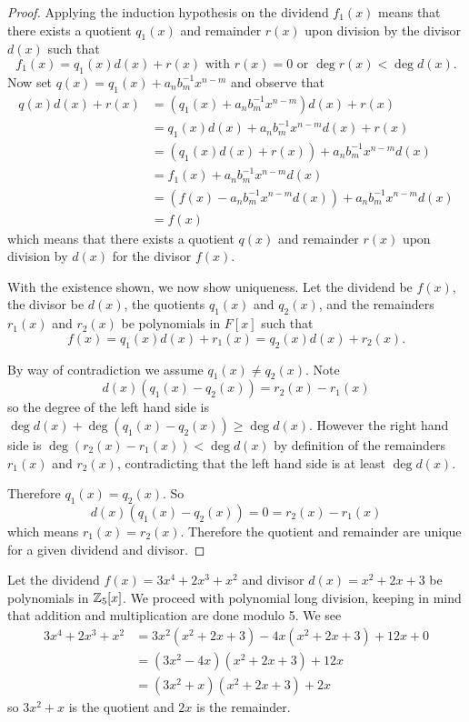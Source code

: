 \begin{proof}
    Applying the induction hypothesis on the dividend $f_1(x)$ means that there exists a quotient $q_1(x)$ and remainder $r(x)$ upon division by the divisor $d(x)$ such that
    \[
        f_1(x) = q_1(x)d(x) + r(x) \text{ with } r(x) = 0 \text{ or } \deg r(x) < \deg d(x).
    \]
    Now set $q(x) = q_1(x) + a_nb_m^{-1}x^{n-m}$ and observe that
    \begin{align*}
        q(x)d(x) + r(x) &= (q_1(x) + a_nb_m^{-1}x^{n-m})d(x) + r(x)\\
        &= q_1(x)d(x) + a_nb_m^{-1}x^{n-m}d(x) + r(x)\\
        &= (q_1(x)d(x) + r(x)) + a_nb_m^{-1}x^{n-m}d(x)\\
        &= f_1(x) + a_nb_m^{-1}x^{n-m}d(x)\\
        &= (f(x) - a_nb_m^{-1}x^{n-m}d(x)) + a_nb_m^{-1}x^{n-m}d(x)\\
        &= f(x)
    \end{align*}
    which means that there exists a quotient $q(x)$ and remainder $r(x)$ upon division by $d(x)$ for the divisor $f(x)$.

    With the existence shown, we now show uniqueness. Let the dividend be $f(x)$, the divisor be $d(x)$, the quotients $q_1(x)$ and $q_2(x)$, and the remainders $r_1(x)$ and $r_2(x)$ be polynomials in $F[x]$ such that
    \[
        f(x) = q_1(x)d(x) + r_1(x) = q_2(x)d(x) + r_2(x).
    \]

    By way of contradiction we assume $q_1(x) \neq q_2(x)$. Note
    \[
        d(x)(q_1(x) - q_2(x)) = r_2(x) - r_1(x)
    \]
    so the degree of the left hand side is $\deg d(x) + \deg(q_1(x) - q_2(x)) \geq \deg d(x)$. However the right hand side is $\deg(r_2(x) - r_1(x)) < \deg d(x)$ by definition of the remainders $r_1(x)$ and $r_2(x)$, contradicting that the left hand side is at least $\deg d(x)$.

    Therefore $q_1(x) = q_2(x)$. So
    \[
        d(x)(q_1(x) - q_2(x)) = 0 = r_2(x) - r_1(x)
    \]
    which means $r_1(x) = r_2(x)$. Therefore the quotient and remainder are unique for a given dividend and divisor.
\end{proof}

\begin{example}
    Let the dividend $f(x) = 3x^4 + 2x^3 + x^2$ and divisor $d(x) = x^2 + 2x + 3$ be polynomials in $\mathbb{Z}_5[x]$. We proceed with polynomial long division, keeping in mind that addition and multiplication are done modulo 5. We see
    \begin{align*}
        3x^4 + 2x^3 + x^2 &= 3x^2(x^2 + 2x + 3) - 4x(x^2 + 2x + 3) + 12x + 0\\
        &= (3x^2-4x)(x^2+2x+3) + 12x\\
        &= (3x^2+x)(x^2+2x+3) + 2x
    \end{align*}
    so $3x^2+x$ is the quotient and $2x$ is the remainder.
\end{example}

